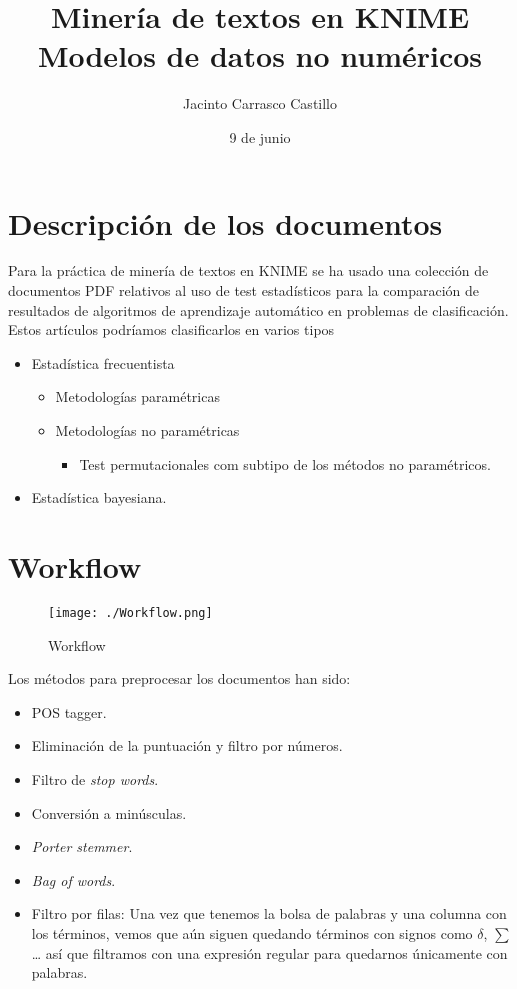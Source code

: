 \documentclass[11pt]{article}
\author{Jacinto Carrasco Castillo}
\date{9 de junio}
\title{Minería de textos en KNIME\\\medskip
\large Modelos de datos no numéricos}
\begin{document}
\maketitle

\section{Descripción de los documentos}
\label{sec:org84e2938}

Para la práctica de minería de textos en KNIME se ha usado una
colección de documentos PDF relativos al uso de test estadísticos para
la comparación de resultados de algoritmos de aprendizaje automático
en problemas de clasificación. Estos artículos podríamos clasificarlos
en varios tipos
\begin{itemize}
\item Estadística frecuentista
\begin{itemize}
\item Metodologías paramétricas
\item Metodologías no paramétricas
\begin{itemize}
\item Test permutacionales com subtipo de los métodos no paramétricos.
\end{itemize}
\end{itemize}
\item Estadística bayesiana.
\end{itemize}


\section{Workflow}
\label{sec:org74724de}

\begin{figure}[htbp]
\centering
\texttt{[image: ./Workflow.png]}
\caption{\label{fig:org8427546}
Workflow}
\end{figure}

Los métodos para preprocesar los documentos han sido:
\begin{itemize}
\item POS tagger.
\item Eliminación de la puntuación y filtro por números.
\item Filtro de \emph{stop words}.
\item Conversión a minúsculas.
\item \emph{Porter stemmer}.
\item \emph{Bag of words}.
\item Filtro por filas: Una vez que tenemos la bolsa de palabras y una
columna con los términos, vemos que aún siguen quedando términos con
signos como \(\delta\), \(\sum\)\ldots{} así que filtramos con una expresión
regular para quedarnos únicamente con palabras.
\end{itemize}
\end{document}
